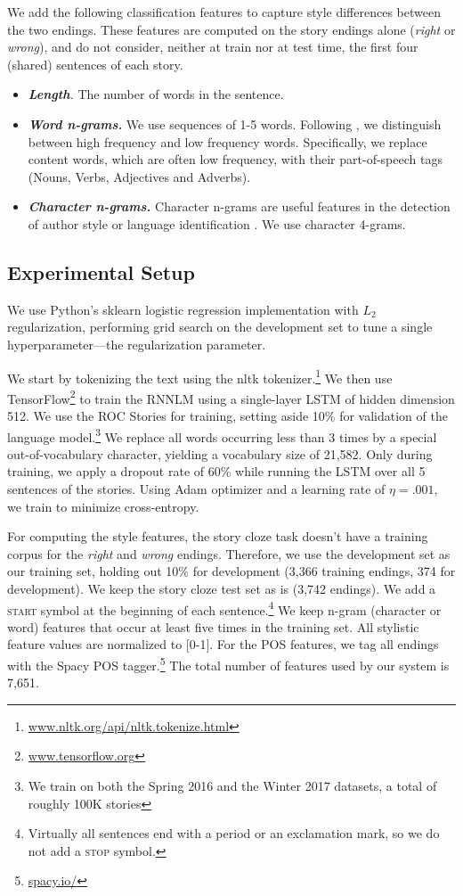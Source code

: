 \documentclass[11pt]{article}
\begin{document}
We add the following classification features to capture style differences between the two endings. 
These features are computed on the story endings alone ({\it right} or {\it wrong}), and do not consider, neither at train nor at test time, the first four (shared) sentences of each story.
\begin{itemize}
\item\textit{\textbf{Length}.} The number of words in the sentence.
\item\textit{\textbf{Word n-grams.}} We use sequences of 1-5 words. Following \cite{Tsur:2010,Schwartz:2013}, we distinguish between high frequency and low frequency words. 
Specifically, we replace content words, which are often low frequency, with their part-of-speech tags (Nouns, Verbs, Adjectives and Adverbs).
\item\textit{\textbf{Character n-grams.}} Character n-grams are useful features in the detection of author style \cite{Stamatatos:2009} or language identification \cite{lui2011cross}.
We use character 4-grams.
\end{itemize}



\subsection{Experimental Setup}
We use  Python's sklearn logistic regression implementation with $L_2$
regularization, performing grid search on the development set to
tune a single hyperparameter---the regularization parameter.  

We start by tokenizing the text using the nltk tokenizer.\footnote{\url{www.nltk.org/api/nltk.tokenize.html}} 
We then use TensorFlow\footnote{\url{www.tensorflow.org}} to train the RNNLM using a single-layer LSTM of hidden dimension 512.
We use the ROC Stories for training, setting aside 10\% for validation of the language model.\footnote{We train on both the Spring 2016 and the Winter 2017 datasets, a total of roughly 100K stories}
We replace all words occurring less than 3 times by a special out-of-vocabulary character, yielding a vocabulary size of 21,582.
Only during training, we apply a dropout rate of 60\% while running the LSTM over all 5 sentences of the stories. 
Using Adam optimizer \cite{kingma2014adam} and a learning rate of
$\eta=.001$, we train to minimize cross-entropy.

For computing the style features, the story cloze task doesn't have a training corpus for the {\it right} and {\it wrong} endings.
Therefore, we use the development set as our training set, holding out 10\% for development
(3,366 training endings, 374 for development). We keep the story cloze test set as is (3,742 endings).
We add a \textsc{start} symbol at the beginning
of each sentence.\footnote{Virtually all sentences end with a period
  or an exclamation mark, so we do not add a \textsc{stop} symbol.} 
 We keep n-gram (character or word) features that occur at least five times in the training set.
All stylistic feature values are normalized to [0-1].
For the POS features, we tag all endings with the Spacy POS tagger.\footnote{\url{spacy.io/}}
The total number of features used by our system is 7,651.
\end{document}
